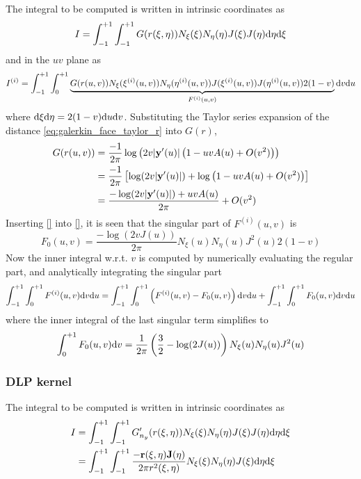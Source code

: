 The integral to be computed is written in intrinsic coordinates as
%
\begin{equation}
	I = \int_{-1}^{+1}
	\int_{-1}^{+1}
	G(r(\xi,\eta)) 
	N_{\xi}(\xi) N_{\eta}(\eta) 
	J(\xi) J(\eta)
	\mathrm{d} \eta
	\mathrm{d} \xi
\end{equation}
%
and in the $uv$ plane as
%
\begin{equation}
	I^{(i)} = \int_{-1}^{+1}
	\int_{0}^{+1}
	\underbrace{G(r(u,v)) N_{\xi}(\xi^{(i)}(u,v)) N_{\eta}(\eta^{(i)}(u,v)) 
	J(\xi^{(i)}(u,v)) J(\eta^{(i)}(u,v)) 2(1-v)}_{F^{(i)}(u,v)}
	\mathrm{d} v
	\mathrm{d} u
\end{equation}
%
where $\mathrm{d}\xi \mathrm{d}\eta = 2(1-v) \mathrm{d} u \mathrm{d} v$.
Substituting the Taylor series expansion of the distance \eqref{eq:galerkin_face_taylor_r} into $G(r)$, 
%
\begin{align}
	G(r(u,v)) 
	&= \frac{-1}{2\pi} \log\left(2v|{\bf y}'(u)| \left(1 - u v A(u) + O(v^2) \right)\right) \\
	&= \frac{-1}{2\pi} \left[ 
	\log(2v|{\bf y}'(u)| )
	+
	\log \left(1 - u v A(u) + O(v^2) \right)
	\right] \\
	&= \frac{-\log(2v|{\bf y}'(u)| )
	+
	u v A(u)
	}{2\pi} 
	 + O(v^2)
\end{align}
%
Inserting \eqref{} into \eqref{}, it is seen that the singular part of $F^{(i)}(u,v)$ is
%
\begin{equation}
	F_0(u,v) = \frac{-\log(2v J(u) )}{2\pi} 
	N_{\xi}(u) N_{\eta}(u) 
	J^2(u) 2(1-v)
\end{equation}
%
Now the inner integral w.r.t. $v$ is computed by numerically evaluating the regular part, and analytically integrating the singular part
%
\begin{equation}
	\int_{-1}^{+1} \int_{0}^{+1} F^{(i)}(u,v) \mathrm{d} v \mathrm{d} u
	= 
	\int_{-1}^{+1} \int_{0}^{+1} \left( F^{(i)}(u,v) - F_0(u,v) \right) \mathrm{d} v \mathrm{d} u
	+
	\int_{-1}^{+1} \int_{0}^{+1} F_0(u,v) \mathrm{d} v \mathrm{d} u
\end{equation}
%
where the inner integral of the last singular term simplifies to
%
\begin{equation}
	\int_{0}^{+1} F_0(u,v) \mathrm{d} v = \frac{1}{2\pi} \left(\frac{3}{2} - \log(2 J(u)) \right) N_{\xi}(u) N_{\eta}(u) 
	J^2(u)
\end{equation}

\subsubsection{DLP kernel}

The integral to be computed is written in intrinsic coordinates as
%
\begin{align}
	I 
	&= \int_{-1}^{+1}
	\int_{-1}^{+1}
	G'_{n_y}(r(\xi,\eta)) 
	N_{\xi}(\xi) N_{\eta}(\eta)
	J(\xi) J(\eta)
	\mathrm{d} \eta
	\mathrm{d} \xi \\
	&= \int_{-1}^{+1}
	\int_{-1}^{+1}
	\frac{-{\bf r}(\xi,\eta) {\bf J}(\eta)}{2\pi r^2(\xi,\eta)}
	N_{\xi}(\xi) N_{\eta}(\eta)
	J(\xi)
	\mathrm{d} \eta
	\mathrm{d} \xi
\end{align}

